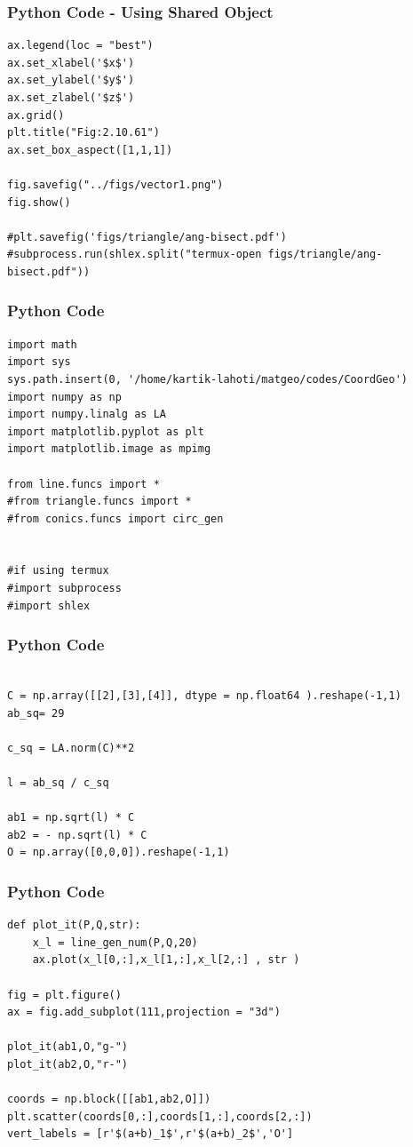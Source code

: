 \documentclass{beamer}
\begin{document}
\begin{frame}[fragile]
    \frametitle{Python Code - Using Shared Object}
    \begin{lstlisting}
ax.legend(loc = "best")
ax.set_xlabel('$x$')
ax.set_ylabel('$y$')
ax.set_zlabel('$z$')
ax.grid()
plt.title("Fig:2.10.61")
ax.set_box_aspect([1,1,1])

fig.savefig("../figs/vector1.png")
fig.show()

#plt.savefig('figs/triangle/ang-bisect.pdf')
#subprocess.run(shlex.split("termux-open figs/triangle/ang-bisect.pdf"))
\end{lstlisting}
\end{frame}

\begin{frame}[fragile]
    \frametitle{Python Code}
    \begin{lstlisting}
import math
import sys 
sys.path.insert(0, '/home/kartik-lahoti/matgeo/codes/CoordGeo')
import numpy as np
import numpy.linalg as LA
import matplotlib.pyplot as plt
import matplotlib.image as mpimg

from line.funcs import *
#from triangle.funcs import *
#from conics.funcs import circ_gen


#if using termux
#import subprocess
#import shlex
\end{lstlisting}
\end{frame}

\begin{frame}[fragile]
    \frametitle{Python Code }
    \begin{lstlisting}

C = np.array([[2],[3],[4]], dtype = np.float64 ).reshape(-1,1)
ab_sq= 29

c_sq = LA.norm(C)**2

l = ab_sq / c_sq

ab1 = np.sqrt(l) * C
ab2 = - np.sqrt(l) * C
O = np.array([0,0,0]).reshape(-1,1)

\end{lstlisting}
\end{frame}

\begin{frame}[fragile]
    \frametitle{Python Code }
    \begin{lstlisting}
def plot_it(P,Q,str):
    x_l = line_gen_num(P,Q,20)
    ax.plot(x_l[0,:],x_l[1,:],x_l[2,:] , str )

fig = plt.figure()
ax = fig.add_subplot(111,projection = "3d")

plot_it(ab1,O,"g-")
plot_it(ab2,O,"r-")

coords = np.block([[ab1,ab2,O]])
plt.scatter(coords[0,:],coords[1,:],coords[2,:])
vert_labels = [r'$(a+b)_1$',r'$(a+b)_2$','O']
\end{lstlisting}
\end{frame}
\end{document}
